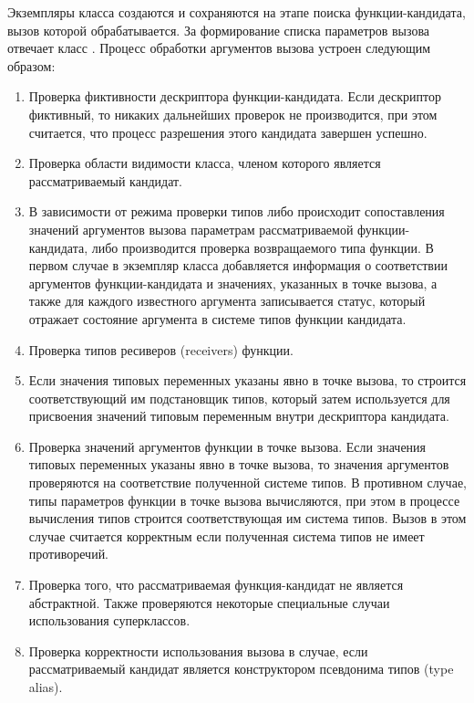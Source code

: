 Экземпляры класса  создаются и сохраняются на этапе поиска функции-кандидата, вызов которой обрабатывается. За формирование списка параметров вызова отвечает класс . Процесс обработки аргументов вызова устроен следующим образом:
\begin{enumerate}
    \item Проверка фиктивности дескриптора функции-кандидата. Если дескриптор фиктивный, то никаких дальнейших проверок не производится, при этом считается, что процесс разрешения этого кандидата завершен успешно.  
    \item Проверка области видимости класса, членом которого является рассматриваемый кандидат. 
    \item В зависимости от режима проверки типов либо происходит сопоставления значений аргументов вызова параметрам рассматриваемой функции-кандидата, либо производится проверка возвращаемого типа функции. В первом случае в экземпляр класса  добавляется информация о соответствии аргументов функции-кандидата и значениях, указанных в точке вызова, а также для каждого известного аргумента записывается статус, который отражает состояние аргумента в системе типов функции кандидата.  
    \item Проверка типов ресиверов (receivers) функции.
    \item Если значения типовых переменных указаны явно в точке вызова, то строится соответствующий им подстановщик типов, который затем используется для присвоения значений типовым переменным внутри дескриптора кандидата.
    \item Проверка значений аргументов функции в точке вызова. Если значения типовых переменных указаны явно в точке вызова, то значения аргументов проверяются на соответствие полученной системе типов. В противном случае, типы параметров функции в точке вызова вычисляются, при этом в процессе вычисления типов строится соответствующая им система типов. Вызов в этом случае считается корректным если полученная система типов не имеет противоречий.      
    \item Проверка того, что рассматриваемая функция-кандидат не является абстрактной. Также проверяются некоторые специальные случаи использования суперклассов.
    \item Проверка корректности использования вызова в случае, если рассматриваемый кандидат является конструктором псевдонима типов (type alias). 
\end{enumerate}

